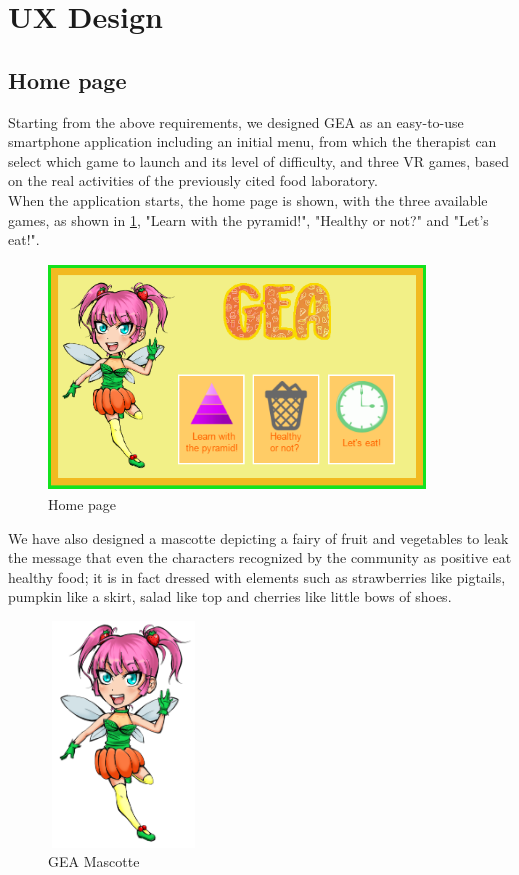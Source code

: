 \section{UX Design}
\subsection{Home page}
Starting from the above requirements, we designed GEA as an easy-to-use smartphone application including an initial menu, from which the therapist can select which game to launch and its level of difficulty, and three VR games, based on the real activities of the previously cited food laboratory.\\
When the application starts, the home page is shown, with the three available games, as shown in \ref{fig:home}, "Learn with the pyramid!", "Healthy or not?" and "Let's eat!". \\
\begin{figure}[H]
\centering
\includegraphics[width=10cm, height=6cm]{immagini/Game.png}
\caption{Home page}\label{fig:home}
\end{figure}
We have also designed a mascotte depicting a fairy of fruit and vegetables to leak the message that even the characters recognized by the community as positive eat healthy food; it is in fact dressed with elements such as strawberries like pigtails, pumpkin like a skirt, salad like top and cherries like little bows of shoes.
\begin{figure}[H]
\centering
\includegraphics[width=4cm, height=6cm]{immagini/geamasc1.png}
\caption{GEA Mascotte}\label{fig:mascotte1}
\end{figure}
